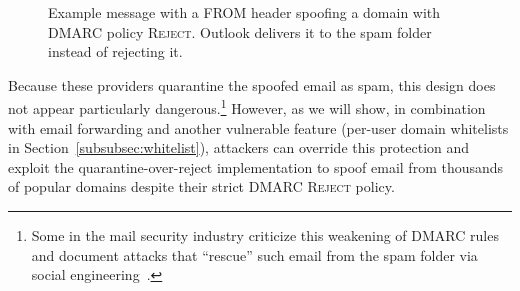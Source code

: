 \begin{figure}[t]
    \centering
{
    \setlength{\fboxsep}{0pt}
    \setlength{\fboxrule}{0.5pt}
}
    \caption[Example of a Spoofed Message]{Example message with a FROM header spoofing a domain with DMARC policy \textsc{Reject}.  Outlook delivers it to the spam folder instead of rejecting it.
    }
    \label{fig:example_ms_not_rejecting}
    \end{figure}

%

Because these providers quarantine the spoofed email as spam, this
design does not appear particularly dangerous.\footnote{Some in the
  mail security industry criticize this weakening of DMARC
  rules and document attacks that ``rescue'' such email from the spam folder via social engineering~\cite{Microsof7:online,Spearphi83:online}.} However, as we
will show, in combination with email forwarding and another
vulnerable feature (per-user domain whitelists in Section~\ref{subsubsec:whitelist}), attackers can override this
protection and exploit the quarantine-over-reject implementation to spoof
email from thousands of popular domains despite their strict
DMARC \textsc{Reject} policy.


